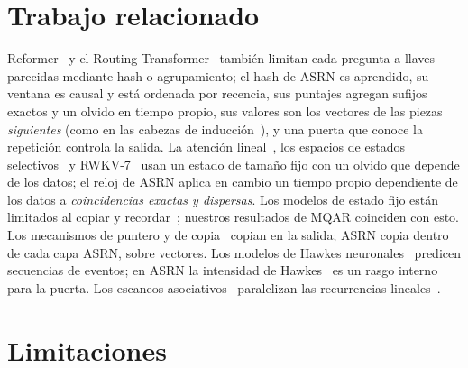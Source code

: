 \documentclass[11pt]{article}
\begin{document}
\section{Trabajo relacionado}

Reformer~\cite{kitaev2020reformer} y el Routing Transformer~\cite{roy2021routing} también limitan cada pregunta a llaves
parecidas mediante hash o agrupamiento; el hash de ASRN es aprendido, su ventana es causal y está ordenada por recencia,
sus puntajes agregan sufijos exactos y un olvido en tiempo propio, sus valores son los vectores de las piezas
\emph{siguientes} (como en las cabezas de inducción~\cite{olsson2022induction}), y una puerta que conoce la repetición
controla la salida. La atención lineal~\cite{katharopoulos2020transformers}, los espacios de estados
selectivos~\cite{gu2023mamba,dao2024transformers} y RWKV-7~\cite{peng2025rwkv7} usan un estado de tamaño fijo con un
olvido que depende de los datos; el reloj de ASRN aplica en cambio un tiempo propio dependiente de los datos a
\emph{coincidencias exactas y dispersas}. Los modelos de estado fijo están limitados al copiar y
recordar~\cite{jelassi2024repeat,arora2023zoology}; nuestros resultados de MQAR coinciden con esto. Los mecanismos de
puntero y de copia~\cite{vinyals2015pointer,gu2016copynet,see2017pointergen,merity2016pointer} copian en la salida; ASRN
copia dentro de cada capa ASRN, sobre vectores. Los modelos de Hawkes neuronales~\cite{mei2017neural,zuo2020transformer}
predicen secuencias de eventos; en ASRN la intensidad de Hawkes~\cite{hawkes1971spectra} es un rasgo interno para la
puerta. Los escaneos asociativos~\cite{blelloch1990prefix} paralelizan las recurrencias
lineales~\cite{martin2018parallelizing,smith2023s5}.

\section{Limitaciones}
\label{sec:limitations}
\end{document}
